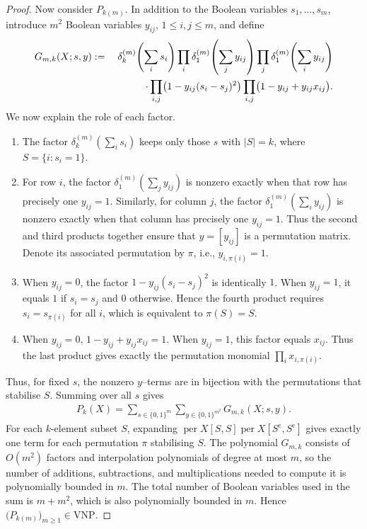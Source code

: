 \documentclass[11pt,a4paper]{article}
\begin{document}
\begin{proof}
Now consider $P_{k(m)}$. In addition to the Boolean variables $s_1,\ldots,s_m$, introduce $m^2$ Boolean variables $y_{ij}$, $1\leq i,j\leq m$, and define
\begin{eqnarray*}
  G_{m,k}(X;s,y)
  &:=\;&\delta_k^{(m)}\!\left(\sum_i s_i\right)
  \prod_i\delta_1^{(m)}\!\left(\sum_jy_{ij}\right)
  \prod_j\delta_1^{(m)}\!\left(\sum_iy_{ij}\right)
  \notag\\
  &&\cdot\prod_{i,j}\bigl(1-y_{ij}(s_i-s_j)^2\bigr)
  \prod_{i,j}\bigl(1-y_{ij}+y_{ij}x_{ij}\bigr).
\end{eqnarray*}
We now explain the role of each factor.
\begin{enumerate}
\item The factor $\delta_k^{(m)}(\sum_i s_i)$ keeps only those $s$ with $|S|=k$, where $S=\{i:s_i=1\}$.
\item For row $i$, the factor $\delta_1^{(m)}(\sum_jy_{ij})$ is nonzero exactly when that row has precisely one $y_{ij}=1$. Similarly, for column $j$, the factor $\delta_1^{(m)}(\sum_iy_{ij})$ is nonzero exactly when that column has precisely one $y_{ij}=1$. Thus the second and third products together ensure that $y=[y_{ij}]$ is a permutation matrix. Denote its associated permutation by $\pi$, i.e., $y_{i,\pi(i)}=1$.
\item When $y_{ij}=0$, the factor $1-y_{ij}(s_i-s_j)^2$ is identically $1$. When $y_{ij}=1$, it equals $1$ if $s_i=s_j$ and $0$ otherwise.
      Hence the fourth product requires $s_i=s_{\pi(i)}$ for all $i$, which is equivalent to $\pi(S)=S$.
\item When $y_{ij}=0$, $1-y_{ij}+y_{ij}x_{ij}=1$. When $y_{ij}=1$, this factor equals $x_{ij}$. Thus the last product gives exactly the permutation monomial $\prod_i x_{i,\pi(i)}$.
\end{enumerate}
Thus, for fixed $s$, the nonzero $y$–terms are in bijection with the permutations that stabilise $S$. Summing over all $s$ gives
\begin{eqnarray*}
  P_k(X)
  =\sum_{s\in\{0,1\}^m}
   \sum_{y\in\{0,1\}^{m^2}}G_{m,k}(X;s,y).
\end{eqnarray*}
For each $k$-element subset $S$, expanding $\operatorname{per} X[S,S]\operatorname{per} X[S^{\mathrm{c}},S^{\mathrm{c}}]$ gives exactly one term for each permutation $\pi$ stabilising $S$. The polynomial $G_{m,k}$ consists of $O(m^2)$ factors and interpolation polynomials of degree at most $m$, so the number of additions, subtractions, and multiplications needed to compute it is polynomially bounded in $m$. The total number of Boolean variables used in the sum is $m+m^2$, which is also polynomially bounded in $m$. Hence $\bigl(P_{k(m)}\bigr)_{m\geq1}\in\mathrm{VNP}$.

\end{proof}
\end{document}
